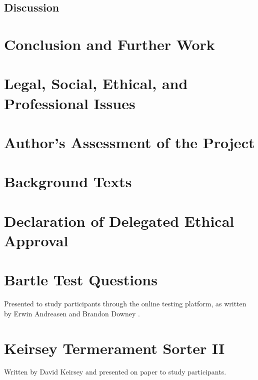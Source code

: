 \documentclass[12pt,a4paper,twoside]{report}
\begin{document}
\section{Discussion}

\chapter{Conclusion and Further Work}

\chapter{Legal, Social, Ethical, and Professional Issues}
\label{sec:issues}

\chapter{Author's Assessment of the Project}

\chapter{Background Texts}
\begin{appendices}
	
\chapter{Declaration of Delegated Ethical Approval}
\label{sec:bsrec}

	
\chapter{Bartle Test Questions}
\label{sec:bartle}
Presented to study participants through the online testing platform, as written by Erwin Andreasen and Brandon Downey \cite{bartle-questions}.
\linespread{1.0}

\linespread{1.3}

\chapter{Keirsey Termerament Sorter II}
\label{sec:keirsey}
Written by David Keirsey \cite{keirsey1998please} and presented on paper to study participants.

\end{appendices}



\end{document}

